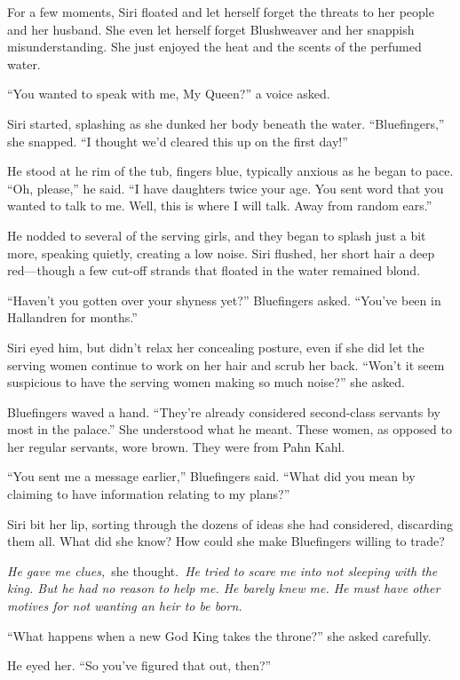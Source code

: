For a few moments, Siri floated and let herself forget the threats to her people and her husband. She even let herself forget Blushweaver and her snappish misunderstanding. She just enjoyed the heat and the scents of the perfumed water.

“You wanted to speak with me, My Queen?” a voice asked.

Siri started, splashing as she dunked her body beneath the water. “Bluefingers,” she snapped. “I thought we’d cleared this up on the first day!”

He stood at he rim of the tub, fingers blue, typically anxious as he began to pace. “Oh, please,” he said. “I have daughters twice your age. You sent word that you wanted to talk to me. Well, this is where I will talk. Away from random ears.”

He nodded to several of the serving girls, and they began to splash just a bit more, speaking quietly, creating a low noise. Siri flushed, her short hair a deep red—though a few cut-off strands that floated in the water remained blond.

“Haven’t you gotten over your shyness yet?” Bluefingers asked. “You’ve been in Hallandren for months.”

Siri eyed him, but didn’t relax her concealing posture, even if she did let the serving women continue to work on her hair and scrub her back. “Won’t it seem suspicious to have the serving women making so much noise?” she asked.

Bluefingers waved a hand. “They’re already considered second-class servants by most in the palace.” She understood what he meant. These women, as opposed to her regular servants, wore brown. They were from Pahn Kahl.

“You sent me a message earlier,” Bluefingers said. “What did you mean by claiming to have information relating to my plans?”

Siri bit her lip, sorting through the dozens of ideas she had considered, discarding them all. What did she know? How could she make Bluefingers willing to trade?

\textit{He gave me clues,}~she thought.~\textit{He tried to scare me into not sleeping with the king. But he had no reason to help me. He barely knew me. He must have other motives for not wanting an heir to be born.}

“What happens when a new God King takes the throne?” she asked carefully.

He eyed her. “So you’ve figured that out, then?”

